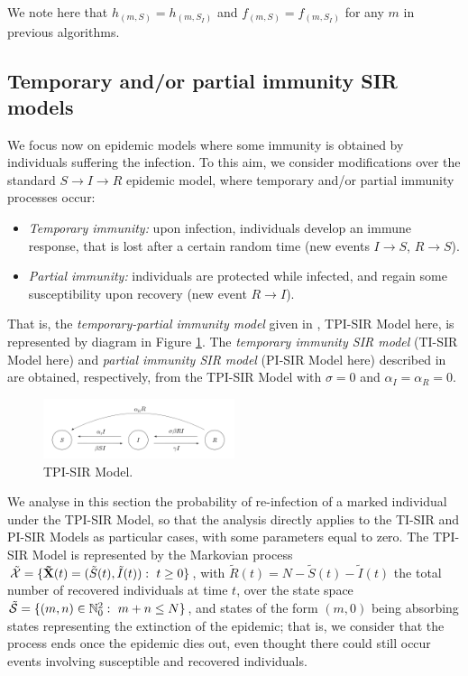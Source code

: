 \documentclass[10pt,A4paper]{article}
\begin{document}
\vspace{1cm}

\par\noindent We note here that $h_{(m,S)}=h_{(m,S_I)}$ and $f_{(m,S)}=f_{(m,S_I)}$ for any $m$ in previous algorithms.

\subsection{Temporary and/or partial immunity SIR models}

\par We focus now on epidemic models where some immunity is obtained by individuals suffering the infection. To this aim, we consider modifications
over the standard $S\rightarrow I\rightarrow R$ epidemic model, where temporary and/or partial immunity processes occur:
\begin{itemize}
 \item {\it Temporary immunity:} upon infection, individuals develop an immune response, that is lost after a certain random time (new events $I\rightarrow S$, $R\rightarrow S$).
  \item {\it Partial immunity:} individuals are protected while infected, and regain some susceptibility upon recovery (new event $R\rightarrow I$).
\end{itemize}

That is, the {\it temporary-partial immunity model} given in \cite[Figure 1(e)]{Gomes04}, TPI-SIR Model here, is represented by diagram in Figure
\ref{fig:4}. The {\it temporary immunity SIR model} (TI-SIR Model here) and {\it partial immunity SIR model} (PI-SIR Model here) described in \cite[Figure 1(c)-(d)]{Gomes04} are obtained,
respectively, from the TPI-SIR Model with $\sigma=0$ and $\alpha_I=\alpha_R=0$.
\begin{figure}[h!]
\centering
 \includegraphics[width=0.5\textwidth]{Figure4.jpg}
\caption{TPI-SIR Model.}
\label{fig:4}
\end{figure}

\par We analyse in this section the probability of re-infection of a marked individual under the TPI-SIR Model, so that the analysis directly
applies to the TI-SIR and PI-SIR Models as particular cases, with some parameters equal to zero. The TPI-SIR Model is represented by the Markovian
process ${\cal \tilde X}=\{{\bf \tilde X}(t)=({\tilde S}(t),{\tilde I}(t)):\ t\geq0\}$, with ${\tilde R}(t)=N-{\tilde S}(t)-{\tilde I}(t)$ the total
number of recovered individuals at time $t$, over the state space ${\cal \tilde S}=\{(m,n)\in\mathbb{N}^2_0: \ m+n\leq N\}$,
and states of the form $(m,0)$ being absorbing states representing the extinction of the epidemic; that is, we consider that the process ends once the
epidemic dies out, even thought there could still occur events involving susceptible and recovered individuals.
\end{document}
